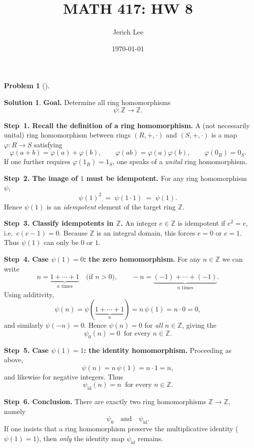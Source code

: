 \documentclass[12pt]{article}
\title{MATH 417: HW 8}
\author{Jerich Lee}
\date{\today}
\theoremstyle{definition} %
\newtheorem{solution}{Solution}
\newtheorem{problem}{Problem}
\theoremstyle{plain} %
\begin{document}
\maketitle
\begin{problem}[]
  
\end{problem}

\begin{solution}
  \textbf{Goal.}  Determine all ring homomorphisms
  \[
  \psi\colon \mathbb Z \longrightarrow \mathbb Z .
  \]
  
  \medskip
  \textbf{Step 1.  Recall the definition of a ring homomorphism.}  
  A (not necessarily unital) ring homomorphism between rings $(R,+,\cdot)$ and $(S,+,\cdot)$ is a map
  $\varphi\colon R\to S$ satisfying
  \[
  \varphi(a+b)=\varphi(a)+\varphi(b),\qquad
  \varphi(ab)=\varphi(a)\varphi(b),\qquad
  \varphi(0_R)=0_S .
  \]
  If one further requires $\varphi(1_R)=1_S$, one speaks of a \emph{unital} ring homomorphism.
  
  \medskip
  \textbf{Step 2.  The image of $1$ must be idempotent.}  
  For any ring homomorphism $\psi$,
  \[
  \psi(1)^2 \;=\; \psi(1\cdot 1)\;=\;\psi(1).
  \]
  Hence $\psi(1)$ is an \emph{idempotent} element of the target ring $\mathbb Z$.
  
  \medskip
  \textbf{Step 3.  Classify idempotents in $\mathbb Z$.}  
  An integer $e\in\mathbb Z$ is idempotent if $e^2=e$, i.e.\ $e(e-1)=0$.  
  Because $\mathbb Z$ is an integral domain, this forces $e=0$ or $e=1$.  
  Thus $\psi(1)$ can only be $0$ or $1$.
  
  \medskip
  \textbf{Step 4.  Case $\psi(1)=0$: the zero homomorphism.}  
  For any $n\in\mathbb Z$ we can write
  \[
  n=\underbrace{1+\cdots+1}_{n\text{ times}} \quad\text{(if }n>0\text{)},
  \qquad
  -n=\underbrace{(-1)+\cdots+(-1)}_{n\text{ times}}.
  \]
  Using additivity,
  \[
  \psi(n)=\psi(\underbrace{1+\cdots+1}_{n})=n\,\psi(1)=n\cdot 0=0,
  \]
  and similarly $\psi(-n)=0$.  Hence $\psi(n)=0$ for \emph{all} $n\in\mathbb Z$, giving the
  \[
  \boxed{\psi_0(n)=0\ \text{ for every }n\in\mathbb Z.}
  \]
  
  \medskip
  \textbf{Step 5.  Case $\psi(1)=1$: the identity homomorphism.}  
  Proceeding as above,
  \[
  \psi(n)=n\,\psi(1)=n\cdot 1=n,
  \]
  and likewise for negative integers.  Thus
  \[
  \boxed{\psi_{\mathrm{id}}(n)=n\ \text{ for every }n\in\mathbb Z.}
  \]
  
  \medskip
  \textbf{Step 6.  Conclusion.}  
  There are exactly two ring homomorphisms $\mathbb Z\to\mathbb Z$, namely
  \[
  \psi_0 \quad\text{and}\quad \psi_{\mathrm{id}} .
  \]
  If one insists that a ring homomorphism preserve the multiplicative identity ($\psi(1)=1$), then \emph{only} the identity map $\psi_{\mathrm{id}}$ remains.
  
  \end{solution}
\end{document}
